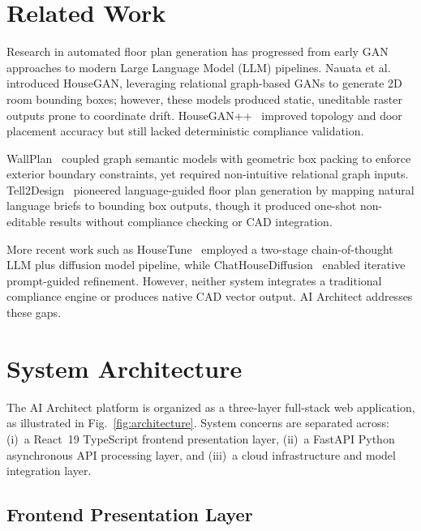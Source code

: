 \documentclass[10pt, twocolumn, letterpaper]{article}
\begin{document}
  \section{Related Work}

  Research in automated floor plan generation has progressed from early GAN
  approaches to modern Large Language Model (LLM) pipelines. Nauata et al.~\cite{houseGAN}
  introduced HouseGAN, leveraging relational graph-based GANs to generate
  2D room bounding boxes; however, these models produced static, uneditable
  raster outputs prone to coordinate drift. HouseGAN++~\cite{houseGANpp}
  improved topology and door placement accuracy but still lacked deterministic
  compliance validation.

  WallPlan~\cite{wallplan} coupled graph semantic models with geometric box
  packing to enforce exterior boundary constraints, yet required non-intuitive
  relational graph inputs. Tell2Design~\cite{tell2design} pioneered
  language-guided floor plan generation by mapping natural language briefs to
  bounding box outputs, though it produced one-shot non-editable results without
  compliance checking or CAD integration.

  More recent work such as HouseTune~\cite{housetune} employed a two-stage
  chain-of-thought LLM plus diffusion model pipeline, while
  ChatHouseDiffusion~\cite{chathousediffusion} enabled iterative prompt-guided
  refinement. However, neither system integrates a traditional compliance engine
  or produces native CAD vector output. AI Architect addresses these gaps.

  \section{System Architecture}

  The AI Architect platform is organized as a three-layer full-stack web
  application, as illustrated in Fig.~\ref{fig:architecture}. System concerns
  are separated across: (i)~a React~19 TypeScript frontend presentation layer,
  (ii)~a FastAPI Python asynchronous API processing layer, and (iii)~a cloud
  infrastructure and model integration layer.

  \subsection{Frontend Presentation Layer}
\end{document}
